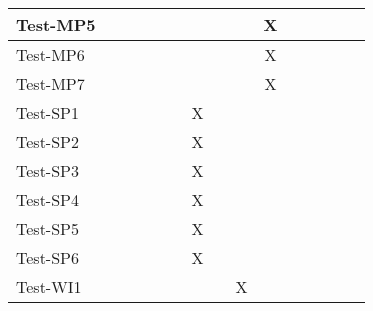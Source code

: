 \documentclass[12pt, titlepage]{article}
\begin{document}
\begin{table}[H]
\begin{adjustwidth}{-0.3in}{-0.5in}
{\begin{tabular}{c|c|c|c|c|c|c|c|c|c|c|c|c|c|c|}
\multicolumn{1}{|l|}{{Test-MP5}}   &             &             &             &             &             &             &             &             &          X    &             &              &             &  &                    \\ \hline
\multicolumn{1}{|l|}{{Test-MP6}}   &             &             &             &             &             &             &             &             &         X    &             &              &             &  &                    \\ \hline
\multicolumn{1}{|l|}{{Test-MP7}}   &             &             &             &             &             &             &             &             &         X     &             &              &             &  &                    \\ \hline
\multicolumn{1}{|l|}{{Test-SP1}}   &             &             &             &             &             &        X     &             &             &              &             &              &             &  &                    \\ \hline
\multicolumn{1}{|l|}{{Test-SP2}}   &             &             &             &             &             &       X      &             &             &              &            &              &             &  &                    \\ \hline
\multicolumn{1}{|l|}{{Test-SP3}}   &             &             &             &             &             &        X     &             &             &              &            &              &             &  &                    \\ \hline
\multicolumn{1}{|l|}{{Test-SP4}}   &             &             &             &             &             &         X    &             &             &              &            &              &             &  &                    \\ \hline
\multicolumn{1}{|l|}{{Test-SP5}}   &             &             &             &             &             &       X      &             &             &              &             &              &             &  &                    \\ \hline
\multicolumn{1}{|l|}{{Test-SP6}}   &             &             &             &             &             &       X      &            &             &              &             &              &             &  &                    \\ \hline
\multicolumn{1}{|l|}{{Test-WI1}}   &             &             &             &             &             &             &             &     X        &              &              &              &             &  &                    \\ \hline

\end{tabular}}
\end{adjustwidth}
\end{table}
\end{document}
